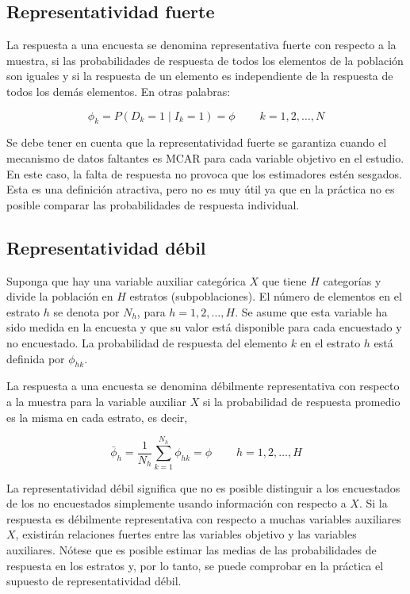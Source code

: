 \documentclass[
  12pt,
]{book}
\begin{document}
\hypertarget{representatividad-fuerte}{%
\subsection{Representatividad fuerte}\label{representatividad-fuerte}}

La respuesta a una encuesta se denomina representativa fuerte con
respecto a la muestra, si las probabilidades de respuesta de todos
los elementos de la población son iguales y si la respuesta de un
elemento es independiente de la respuesta de todos los demás elementos.
En otras palabras:

\[
\phi_{k} = P\left(D_{k}=1\mid I_{k}=1\right) =  \phi  \ \ \ \ \ \ \ \ \ \ k=1,2,\ldots,N
\]

Se debe tener en cuenta que la representatividad fuerte se garantiza cuando el mecanismo de datos faltantes es MCAR para cada variable objetivo en el estudio. En este caso, la falta de respuesta no provoca que los estimadores estén sesgados. Esta es una definición atractiva, pero no es muy útil ya que en la práctica no es posible comparar las probabilidades de respuesta individual.

\hypertarget{representatividad-duxe9bil}{%
\subsection{Representatividad débil}\label{representatividad-duxe9bil}}

Suponga que hay una variable auxiliar categórica \(X\) que tiene \(H\)
categorías y divide la población en \(H\) estratos (subpoblaciones).
El número de elementos en el estrato \(h\) se denota por \(N_{h}\),
para \(h=1,2,\ldots,H\). Se asume que esta variable ha sido medida
en la encuesta y que su valor está disponible para cada encuestado
y no encuestado. La probabilidad de respuesta del elemento \(k\) en
el estrato \(h\) está definida por \(\phi_{hk}\).

La respuesta a una encuesta se denomina débilmente representativa
con respecto a la muestra para la variable auxiliar \(X\) si la probabilidad
de respuesta promedio es la misma en cada estrato, es decir,

\[
\bar{\phi}_{h} =  
\frac{1}{N_{h}}\sum_{k=1}^{N_{h}}\phi_{hk} =
\phi \ \ \ \ \ \ \ \ \ \  h=1,2,\ldots,H
\]

La representatividad débil significa que no es posible distinguir
a los encuestados de los no encuestados simplemente usando información
con respecto a \(X\). Si la respuesta es débilmente representativa con respecto a muchas variables auxiliares \(X\), existirán relaciones fuertes entre las variables objetivo y las variables auxiliares. Nótese que es posible estimar las medias de las probabilidades de respuesta en los estratos y, por lo tanto, se puede comprobar en la práctica el supuesto de representatividad débil.
\end{document}
